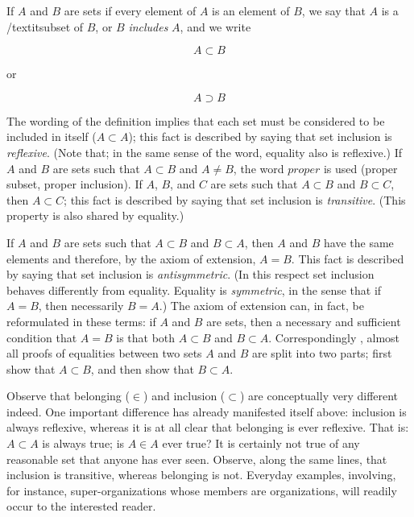 	If $A$ and $B$ are sets if every element of $A$ is an element of $B$, we say that $A$ is a /textit{subset} of $B$, or $B$ \textit{includes} $A$, and we write 

\begin{equation*}
A \subset B
\end{equation*}

or

\begin{equation*}
A \supset B
\end{equation*}

The wording of the definition implies that each set must be considered to be included in itself ($A \subset A$); this fact is described by saying that set inclusion is \textit{reflexive}. (Note that; in the same sense of the word, equality also is reflexive.) If $A$ and $B$ are sets such that $A \subset B$ and $A \neq B$, the word $proper$ is used (proper subset, proper inclusion). If $A$, $B$, and $C$ are sets such that $A \subset B$ and $B \subset C$, then $A \subset C$; this fact is described by saying that set inclusion is \textit{transitive}. (This property is also shared by equality.)


	If $A$ and $B$ are sets such that $A \subset B$ and $B \subset A$, then $A$ and $B$ have the same elements and therefore, by the axiom of extension, $A = B$. This fact is described by saying that set inclusion is \textit{antisymmetric}. (In this respect set inclusion behaves differently from equality. Equality is \textit{symmetric}, in the sense that if $A = B$, then necessarily $B = A$.) The axiom of extension can, in fact, be reformulated in these terms: if $A$ and $B$ are sets, then a necessary and sufficient condition that $A = B$ is that both $A \subset B$ and $B \subset A$. Correspondingly , almost all proofs of equalities between two sets $A$ and $B$ are split into two parts; first show that $A \subset B$, and then show that $B \subset A$. 


	Observe that belonging ($ \in$) and inclusion ($ \subset$) are conceptually very different indeed. One important difference has already manifested itself above: inclusion is always reflexive, whereas it is at all clear that belonging is ever reflexive. That is: $A \subset A$ is always true; is $A \in A$ ever true? It is certainly not true of any reasonable set that anyone has ever seen. Observe, along the same lines, that inclusion is transitive, whereas belonging is not. Everyday examples, involving, for instance, super-organizations whose members are organizations, will readily occur to the interested reader.